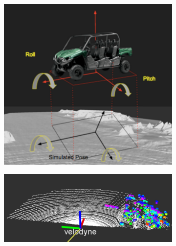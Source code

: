 \documentclass[../thesis.tex]{subfiles}
\begin{document}
\begin{figure}[t]
    	\centering
    	\begin{subfigure}[b]{0.3\linewidth}
    	 \includegraphics[width=\columnwidth]{./RRTPlanner/fig/mesh.png}
           	\label{fig:collision_mesh}
    	\end{subfigure}
    	\begin{subfigure}[b]{0.3\linewidth}
    	 \includegraphics[width=\columnwidth]{./RRTPlanner/fig/ransac.png}
           	\label{fig:collision_ransac}
    	\end{subfigure}
    	\begin{subfigure}[b]{0.3\linewidth}

\end{subfigure}
\end{figure}
\end{document}
